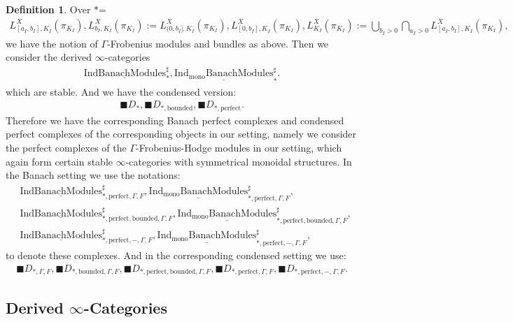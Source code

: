\documentclass[12pt]{article}
\theoremstyle{definition}
\newtheorem{definition}{Definition}
\begin{document}
\begin{definition}
Over $*$=
\begin{align}
L^X_{[a_I,b_I],K_I}(\pi_{K_I}),L^X_{b_I,K_I}(\pi_{K_I}):=L^X_{(0,b_I],K_I}(\pi_{K_I}),L^X_{[0,b_I],K_I}(\pi_{K_I}),L^X_{K_I}(\pi_{K_I}):=\bigcup_{b_I>0}\bigcap_{a_I>0}L^X_{[a_I,b_I],K_I}(\pi_{K_I}),
\end{align} 
we have the notion of $\Gamma$-Frobenius modules and bundles as above. Then we consider the derived $\infty$-categories 
\begin{align}
\underline{\mathrm{IndBanachModules}}^\sharp_*, \underline{\mathrm{Ind_{\mathrm{mono}}BanachModules}}^\sharp_*.
\end{align}
which are stable. And we have the condensed version:
\begin{align}
\blacksquare D_{*}, \blacksquare D_{*,\mathrm{bounded}},\blacksquare D_{*,\mathrm{perfect}}.
\end{align}
Therefore we have the corresponding Banach perfect complexes and condensed perfect complexes of the corresponding objects in our setting, namely we consider the perfect complexes of the $\Gamma$-Frobenius-Hodge modules in our setting, which again form certain stable $\infty$-categories with symmetrical monoidal structures. In the Banach setting we use the notations:
\begin{align}
&\underline{\mathrm{IndBanachModules}}^\sharp_{*,\mathrm{perfect},\Gamma,F}, \underline{\mathrm{Ind_{\mathrm{mono}}BanachModules}}^\sharp_{*,\mathrm{perfect},\Gamma,F},\\
&\underline{\mathrm{IndBanachModules}}^\sharp_{*,\mathrm{perfect},\mathrm{bounded},\Gamma,F}, \underline{\mathrm{Ind_{\mathrm{mono}}BanachModules}}^\sharp_{*,\mathrm{perfect},\mathrm{bounded},\Gamma,F},\\
&\underline{\mathrm{IndBanachModules}}^\sharp_{*,\mathrm{perfect},-,\Gamma,F}, \underline{\mathrm{Ind_{\mathrm{mono}}BanachModules}}^\sharp_{*,\mathrm{perfect},-,\Gamma,F},
\end{align}
to denote these complexes. And in the corresponding condensed setting we use:
\begin{align}
\blacksquare D_{*,\Gamma,F}, \blacksquare D_{*,\mathrm{bounded},\Gamma,F},\blacksquare D_{*,\mathrm{perfect},\mathrm{bounded},\Gamma,F},\blacksquare D_{*,\mathrm{perfect},\Gamma,F},\blacksquare D_{*,\mathrm{perfect},-,\Gamma,F}.
\end{align}
\end{definition}


\subsection{Derived $\infty$-Categories}
\end{document}

